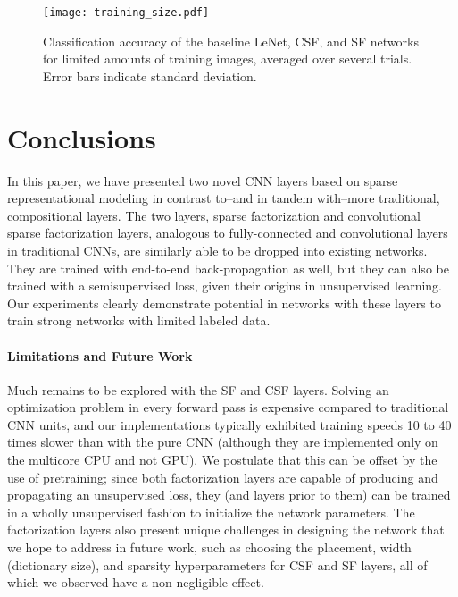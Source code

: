 \documentclass[10pt,twocolumn,letterpaper]{article}
\begin{document}
\begin{figure}[t]
	\begin{center}
		\texttt{[image: training\_size.pdf]}
	\end{center}
	\caption{Classification accuracy of the baseline LeNet, CSF, and SF networks for limited amounts of training images, averaged over several trials. Error bars indicate standard deviation.}
	\label{fig:trainsize}
\end{figure}

\section{Conclusions}
\label{sec:conclusion}
In this paper, we have presented two novel CNN layers based on sparse representational modeling in contrast to--and in tandem with--more traditional, compositional layers.  The two layers, sparse factorization and convolutional sparse factorization layers, analogous to fully-connected and convolutional layers in traditional CNNs, are similarly able to be dropped into existing networks.  They are trained with end-to-end back-propagation as well, but they can also be trained with a semisupervised loss, given their origins in unsupervised learning.  Our experiments clearly demonstrate potential in networks with these layers to train strong networks with limited labeled data.

\paragraph{Limitations and Future Work}
Much remains to be explored with the SF and CSF layers. Solving an optimization problem in every forward pass is expensive compared to traditional CNN units, and our implementations typically exhibited training speeds 10 to 40 times slower than with the pure CNN (although they are implemented only on the multicore CPU and not GPU). We postulate that this can be offset by the use of pretraining; since both factorization layers are capable of producing and propagating an unsupervised loss, they (and layers prior to them) can be trained in a wholly unsupervised fashion to initialize the network parameters. The factorization layers also present unique challenges in designing the network that we hope to address in future work, such as choosing the placement, width (dictionary size), and sparsity hyperparameters for CSF and SF layers, all of which we observed have a non-negligible effect.  
\end{document}
